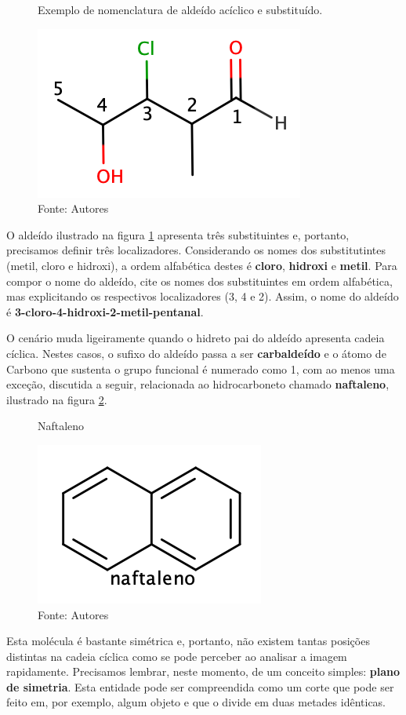\begin{figure}[H]
	\centering
	\vspace{0.25cm}
	\caption{Exemplo de nomenclatura de aldeído acíclico e substituído.}
	\vspace{0.25cm}
	\includegraphics[width=0.45\linewidth]{imagens/aldeidosubst.png}
	\caption*{Fonte: Autores}
	\label{fig:aldeidosubst}
\end{figure}

O aldeído ilustrado na figura \ref{fig:aldeidosubst} apresenta três substituintes e, portanto, precisamos definir três localizadores. Considerando os nomes dos substitutintes (metil, cloro e hidroxi), a ordem alfabética destes é \textbf{cloro}, \textbf{hidroxi} e \textbf{metil}. Para compor o nome do aldeído, cite os nomes dos substituintes em ordem alfabética, mas explicitando os respectivos localizadores (3, 4 e 2). Assim, o nome do aldeído é \textbf{3-cloro-4-hidroxi-2-metil-pentanal}.

O cenário muda ligeiramente quando o hidreto pai do aldeído apresenta cadeia cíclica. Nestes casos, o sufixo do aldeído passa a ser \textbf{carbaldeído} e o átomo de Carbono que sustenta o grupo funcional é numerado como 1, com ao menos uma exceção, discutida a seguir, relacionada ao hidrocarboneto chamado \textbf{naftaleno}, ilustrado na figura \ref{fig:naftaleno}.

\begin{figure}[h]
	\centering
	\vspace{0.5cm}
	\caption{Naftaleno}
	\includegraphics[width=0.25\linewidth]{imagens/naftaleno.png}
	\caption*{Fonte: Autores}
	\label{fig:naftaleno}
\end{figure}

Esta molécula é bastante simétrica e, portanto, não existem tantas posições distintas na cadeia cíclica como se pode perceber ao analisar a imagem rapidamente. Precisamos lembrar, neste momento, de um conceito simples: \textbf{plano de simetria}. Esta entidade pode ser compreendida como um corte que pode ser feito em, por exemplo, algum objeto e que o divide em duas metades idênticas. 

